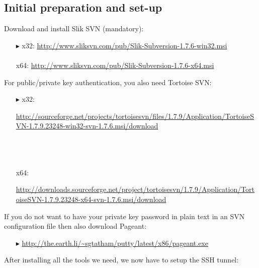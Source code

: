 \subsection{Initial preparation and set-up}

Download and install Slik SVN (mandatory):
\begin{enumerate}
  \item[$\blacktriangleright$] x32: \small{\url{http://www.sliksvn.com/pub/Slik-Subversion-1.7.6-win32.msi}}\\\\
   x64: {\small \url{http://www.sliksvn.com/pub/Slik-Subversion-1.7.6-x64.msi}}
\end{enumerate}

For public/private key authentication, you also need Tortoise SVN:
 
\begin{enumerate}
  \item[$\blacktriangleright$] x32: {\small \begin{minipage}{.95\textwidth}  \url{http://sourceforge.net/projects/tortoisesvn/files/1.7.9/Application/TortoiseSVN-1.7.9.23248-win32-svn-1.7.6.msi/download}
    \end{minipage}}\\\\\\
  x64: {\small\begin{minipage}{.9\textwidth}  \url{http://downloads.sourceforge.net/project/tortoisesvn/1.7.9/Application/TortoiseSVN-1.7.9.23248-x64-svn-1.7.6.msi/download}\end{minipage}}
\end{enumerate} 

If you do not want to have your private key password in plain text in an SVN configuration file then also download Pageant:
\begin{enumerate}
  \item[$\blacktriangleright$] {\small \url{http://the.earth.li/~sgtatham/putty/latest/x86/pageant.exe}}  
\end{enumerate}

After installing all the tools we need, we now have to setup the SSH tunnel:
   
